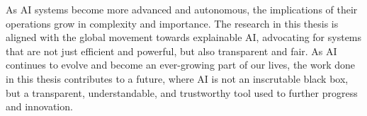 As AI systems become more advanced and autonomous, the implications of their operations grow in complexity and importance. The research in this thesis is aligned with the global movement towards explainable AI, advocating for systems that are not just efficient and powerful, but also transparent and fair. As AI continues to evolve and become an ever-growing part of our lives, the work done in this thesis contributes to a future, where AI is not an inscrutable black box, but a transparent, understandable, and trustworthy tool used to further progress and innovation.